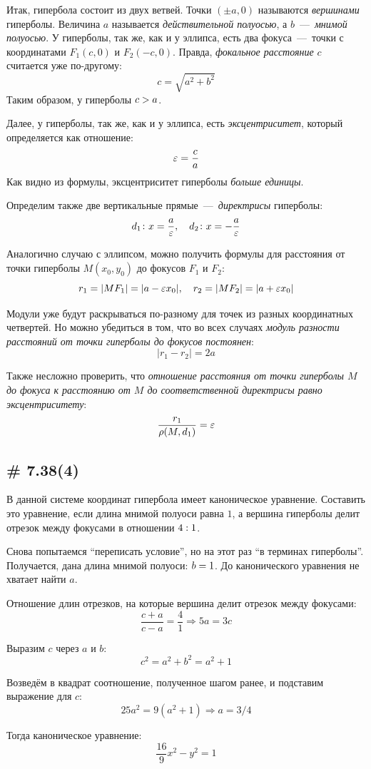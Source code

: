 \documentclass[a4paper,12pt]{article}
\begin{document}
  \medskip
  
  Итак, гипербола состоит из двух ветвей.
  Точки $(\pm a, 0)$ называются \emph{вершинами} гиперболы.
  Величина $a$ называется \emph{действительной полуосью}, а $b$~---~\emph{мнимой полуосью}.
  У гиперболы, так же, как и у эллипса, есть два фокуса~---~точки с координатами $F_1(c, 0)$ и $F_2(-c, 0)$.
  Правда, \emph{фокальное расстояние} $c$ считается уже по-другому:
  \[
    \boxed{
      c = \sqrt{a^2 + b^2}
    }
  \]
  Таким образом, у гиперболы $c \hm> a$.
  
  Далее, у гиперболы, так же, как и у эллипса, есть \emph{эксцентриситет}, который определяется как отношение:
  \[
    \varepsilon = \frac{c}{a}
  \]
  Как видно из формулы, эксцентриситет гиперболы \emph{больше единицы}.
  
  Определим также две вертикальные прямые~---~\emph{директрисы} гиперболы:
  \[
    d_1\colon x = \frac{a}{\varepsilon},\quad d_2\colon x = -\frac{a}{\varepsilon}
  \]
  
  Аналогично случаю с эллипсом, можно получить формулы для расстояния от точки гиперболы $M(x_0, y_0)$ до фокусов $F_1$ и $F_2$:
  \[
    r_1 = |MF_1| = |a - \varepsilon x_0|,\quad r_2 = |MF_2| = |a + \varepsilon x_0|
  \]
  
  Модули уже будут раскрываться по-разному для точек из разных координатных четвертей.
  Но можно убедиться в том, что во всех случаях \emph{модуль разности расстояний от точки гиперболы до фокусов постоянен}:
  \[
    \boxed{
      |r_1 - r_2| = 2a
    }
  \]
  
  Также несложно проверить, что \emph{отношение расстояния от точки гиперболы $M$ до фокуса к расстоянию от $M$ до соответственной директрисы равно эксцентриситету}:
  \[
    \frac{r_1}{\rho(M, d_1)} = \varepsilon
  \]
  
  
  \subsection{\# 7.38(4)}
  
  В данной системе координат гипербола имеет каноническое уравнение.
  Составить это уравнение, если длина мнимой полуоси равна $1$, а вершина гиперболы делит отрезок между фокусами в отношении $4 \hm: 1$.
  
  \begin{solution}
    Снова попытаемся ``переписать условие'', но на этот раз ``в терминах гиперболы''.
    Получается, дана длина мнимой полуоси: $b \hm= 1$.
    До канонического уравнения не хватает найти $a$.
    
    Отношение длин отрезков, на которые вершина делит отрезок между фокусами:
    \[
      \frac{c + a}{c - a} = \frac{4}{1} \Rightarrow 5a = 3c
    \]
    
    Выразим $c$ через $a$ и $b$:
    \[
      c^2 = a^2 + b^2 = a^2 + 1
    \]
    
    Возведём в квадрат соотношение, полученное шагом ранее, и подставим выражение для $c$:
    \[
      25 a^2 = 9 (a^2 + 1) \Rightarrow a = 3/4
    \]
    
    Тогда каноническое уравнение:
    \[
      \frac{16}{9}x^2 - y^2 = 1
    \]
  \end{solution}
  
\end{document}
